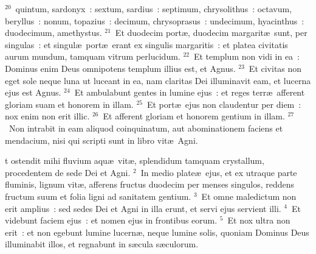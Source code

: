 ${}^{20}$~quintum, sardonyx~: sextum, sardius~: septimum, chrysolithus~: octavum, beryllus~: nonum, topazius~: decimum, chrysoprasus~: undecimum, hyacinthus~: duodecimum, amethystus.
${}^{21}$~Et duodecim port\ae , duodecim margarit\ae\ sunt, per singulas~: et singul\ae\ port\ae\ erant ex singulis margaritis~: et platea civitatis aurum mundum, tamquam vitrum perlucidum.
${}^{22}$~Et templum non vidi in ea~: Dominus enim Deus omnipotens templum illius est, et Agnus.
${}^{23}$~Et civitas non eget sole neque luna ut luceant in ea, nam claritas Dei illuminavit eam, et lucerna ejus est Agnus.
${}^{24}$~Et ambulabunt gentes in lumine ejus~: et reges terr\ae\ afferent gloriam suam et honorem in illam.
${}^{25}$~Et port\ae\ ejus non claudentur per diem~: nox enim non erit illic.
${}^{26}$~Et afferent gloriam et honorem gentium in illam.
${}^{27}$~Non intrabit in eam aliquod coinquinatum, aut abominationem faciens et mendacium, nisi qui scripti sunt in libro vit\ae\ Agni.

\bchapter
{}t ostendit mihi fluvium aqu\ae\ vit\ae , splendidum tamquam crystallum, procedentem de sede Dei et Agni.
${}^{2}$~In medio plate\ae\ ejus, et ex utraque parte fluminis, lignum vit\ae , afferens fructus duodecim per menses singulos, reddens fructum suum et folia ligni ad sanitatem gentium.
${}^{3}$~Et omne maledictum non erit amplius~: sed sedes Dei et Agni in illa erunt, et servi ejus servient illi.
${}^{4}$~Et videbunt faciem ejus~: et nomen ejus in frontibus eorum.
${}^{5}$~Et nox ultra non erit~: et non egebunt lumine lucern\ae , neque lumine solis, quoniam Dominus Deus illuminabit illos, et regnabunt in s\ae cula s\ae culorum.


